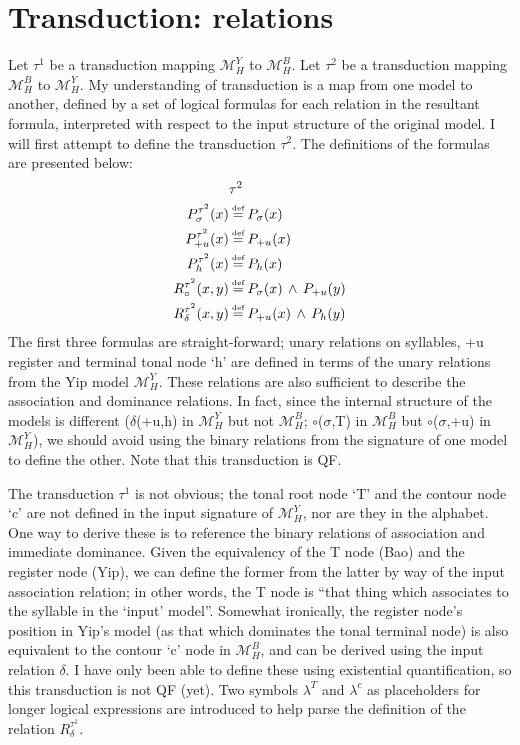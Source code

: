 \documentclass{article}
\newcommand\myeq{\mathrel{\stackrel{\makebox[0pt]{\mbox{\normalfont\tiny def}}}{=}}}
\begin{document}
\section{Transduction: relations}
Let $\tau^1$ be a transduction mapping $\mathcal{M}^{Y}_{H}$ to $\mathcal{M}^{B}_{H}$. Let $\tau^2$ be a transduction mapping $\mathcal{M}^{B}_{H}$ to $\mathcal{M}^{Y}_{H}$. My understanding of transduction is a map from one model to another, defined by a set of logical formulas for each relation in the resultant formula, interpreted with respect to the input structure of the original model. I will first attempt to define the transduction $\tau^2$. The definitions of the formulas are presented below:
\begin{equation}
\begin{split}
&\tau^2 \\
P^{\tau^2}_{\sigma}(x) &\myeq P_{\sigma}(x) \\
P^{\tau^2}_{+u}(x) &\myeq P_{+u}(x) \\
P^{\tau^2}_{h}(x) &\myeq P_{h}(x) \\
R^{\tau^2}_{\circ}(x,y) &\myeq P_{\sigma}(x)\,\wedge\,P_{+u}(y) \\
R^{\tau^2}_{\delta}(x,y) &\myeq P_{+u}(x)\,\wedge\,P_{h}(y) 
\end{split}
\end{equation}
The first three formulas are straight-forward; unary relations on syllables, +u register and terminal tonal node `h' are defined in terms of the unary relations from the Yip model $\mathcal{M}^{Y}_{H}$. These relations are also sufficient to describe the association and dominance relations. In fact, since the internal structure of the models is different ($\delta$(+u,h) in $\mathcal{M}^{Y}_{H}$ but not $\mathcal{M}^{B}_{H}$; $\circ$($\sigma$,T) in $\mathcal{M}^{B}_{H}$ but $\circ$($\sigma$,+u) in $\mathcal{M}^{Y}_{H}$), we should avoid using the binary relations from the signature of one model to define the other. Note that this transduction is QF. \par
The transduction $\tau^1$ is not obvious; the tonal root node `T' and the contour node `c' are not defined in the input signature of $\mathcal{M}^{Y}_{H}$, nor are they in the alphabet. One way to derive these is to reference the binary relations of association and immediate dominance. Given the equivalency of the T node (Bao) and the register node (Yip), we can define the former from the latter by way of the input association relation; in other words, the T node is ``that thing which associates to the syllable in the `input' model''. Somewhat ironically, the register node's position in Yip's model (as that which dominates the tonal terminal node) is also equivalent to the contour `c' node in $\mathcal{M}^{B}_{H}$, and can be derived using the input relation $\delta$. I have only been able to define these using existential quantification, so this transduction is not QF (yet). Two symbols $\lambda^{T}$ and $\lambda^{c}$ as placeholders for longer logical expressions are introduced to help parse the definition of the relation $R^{\tau^1}_{\delta}$.
\end{document}
